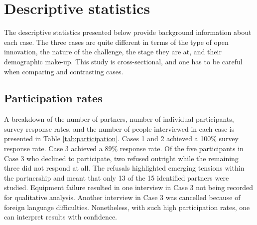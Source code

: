 \section{Descriptive statistics}

The descriptive statistics presented below provide background information about each case. The three cases are quite different in terms of the type of open innovation, the nature of the challenge, the stage they are at, and their demographic make-up. This study is cross-sectional, and one has to be careful when comparing and contrasting cases.

\subsection{Participation rates}

A breakdown of the number of partners, number of individual participants, survey response rates, and the number of people interviewed in each case is presented in Table \ref{tab:participation}. Cases 1 and 2 achieved a 100\% survey response rate. Case 3 achieved a 89\% response rate. Of the five participants in Case 3 who declined to participate, two refused outright while the remaining three did not respond at all. The refusals highlighted emerging tensions within the partnership and meant that only 13 of the 15 identified partners were studied. Equipment failure resulted in one interview in Case 3 not being recorded for qualitative analysis. Another interview in Case 3 was cancelled because of foreign language difficulties. Nonetheless, with such high participation rates, one can interpret results with confidence. \medskip

\begin{table}[h]
\centering
{}
\end{table}

